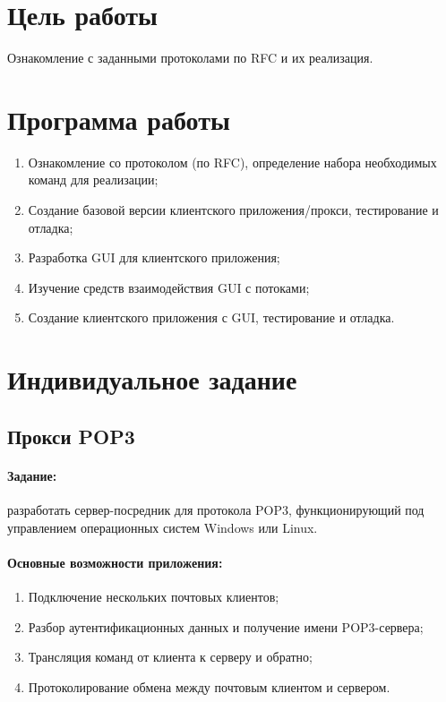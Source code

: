\section{Цель работы}

Ознакомление с заданными протоколами по RFC и их реализация.

\section{Программа работы}

\begin{enumerate}
	\item Ознакомление со протоколом (по RFC), определение набора необходимых команд для реализации;
	\item Создание базовой версии клиентского приложения/прокси, тестирование и отладка;
	\item Разработка GUI для клиентского приложения;
	\item Изучение средств взаимодействия GUI с потоками;
	\item Создание клиентского приложения с GUI, тестирование и отладка.
\end{enumerate}

\section{Индивидуальное задание}
\subsection{Прокси POP3} \label{proxy}

\paragraph{Задание:} 

разработать сервер-посредник для протокола POP3, функционирующий под управлением операционных систем Windows или Linux.

\paragraph{Основные возможности приложения:}

\begin{enumerate}
	\item Подключение нескольких почтовых клиентов;
	\item Разбор аутентификационных данных и получение имени POP3-сервера;
	\item Трансляция команд от клиента к серверу и обратно;
	\item Протоколирование обмена между почтовым клиентом и сервером.
\end{enumerate}

